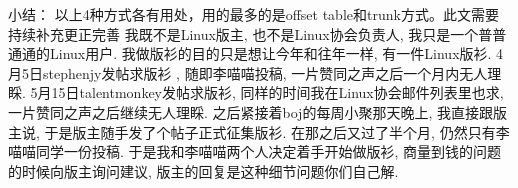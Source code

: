     小结：
    以上4种方式各有用处，用的最多的是offset table和trunk方式。此文需要持续补充更正完善
    我既不是Linux版主, 也不是Linux协会负责人, 我只是一个普普通通的Linux用户. 我做版衫的目的只是想让今年和往年一样, 有一件Linux版衫. 4月5日stephenjy发帖求版衫 , 随即李喵喵投稿, 一片赞同之声之后一个月内无人理睬. 5月15日talentmonkey发帖求版衫, 同样的时间我在Linux协会邮件列表里也求, 一片赞同之声之后继续无人理睬. 之后紧接着boj的每周小聚那天晚上, 我直接跟版主说, 于是版主随手发了个帖子正式征集版衫. 在那之后又过了半个月, 仍然只有李喵喵同学一份投稿. 于是我和李喵喵两个人决定着手开始做版衫, 商量到钱的问题的时候向版主询问建议, 版主的回复是这种细节问题你们自己解.



